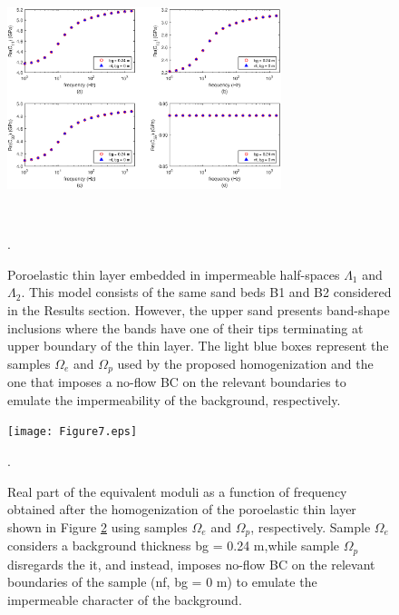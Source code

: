 \documentclass[draft]{agujournal2019}
\begin{document}
\begin{figure}[!ht]
\centering
        \includegraphics[width= 80mm, height=70mm]{Figure6.eps}
\caption{Poroelastic thin layer embedded in impermeable half-spaces $\Lambda_1$ and $\Lambda_2$. This model consists of the same sand beds B1 and B2 considered in the Results section. However, the upper sand presents band-shape inclusions where the bands have one of their tips terminating at upper boundary of the thin layer. The light blue boxes represent the samples $\Omega_e$ and $\Omega_p$ used by the proposed homogenization and the one that imposes a no-flow BC on the relevant boundaries to emulate the impermeability of the background, respectively.}. 
\label{fig.6}
\end{figure}

\begin{figure}[!ht]
\centering
        \texttt{[image: Figure7.eps]}
\caption{Real part of the equivalent moduli as a function of frequency obtained after the homogenization of the poroelastic thin layer shown in Figure \ref{fig.7} using samples $\Omega_e$ and  $\Omega_p$, respectively. Sample $\Omega_e$ considers a background thickness bg = 0.24 m,while sample $\Omega_p$ disregards the it, and instead, imposes no-flow BC on the relevant boundaries of the sample (nf, bg = 0 m) to emulate the impermeable character of the background.}. 

\label{fig.7}
\end{figure}
\end{document}
